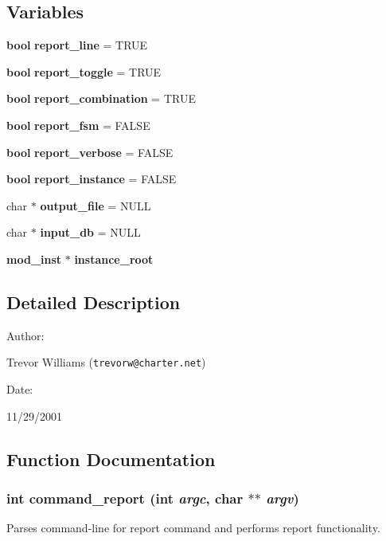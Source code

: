 \subsection*{Variables}
\begin{CompactItemize}
\item 
{\bf bool} {\bf report\_\-line} = TRUE
\item 
{\bf bool} {\bf report\_\-toggle} = TRUE
\item 
{\bf bool} {\bf report\_\-combination} = TRUE
\item 
{\bf bool} {\bf report\_\-fsm} = FALSE
\item 
{\bf bool} {\bf report\_\-verbose} = FALSE
\item 
{\bf bool} {\bf report\_\-instance} = FALSE
\item 
char $\ast$ {\bf output\_\-file} = NULL
\item 
char $\ast$ {\bf input\_\-db} = NULL
\item 
{\bf mod\_\-inst} $\ast$ {\bf instance\_\-root}
\end{CompactItemize}


\subsection{Detailed Description}


\begin{Desc}
\item[Author: ]\par
Trevor Williams ({\tt trevorw@charter.net}) \end{Desc}
\begin{Desc}
\item[Date: ]\par
11/29/2001\end{Desc}


\subsection{Function Documentation}
\subsubsection{\setlength{\rightskip}{0pt plus 5cm}int command\_\-report (int {\em argc}, char $\ast$$\ast$ {\em argv})}\label{report_8c_a15}


Parses command-line for report command and performs report functionality.

